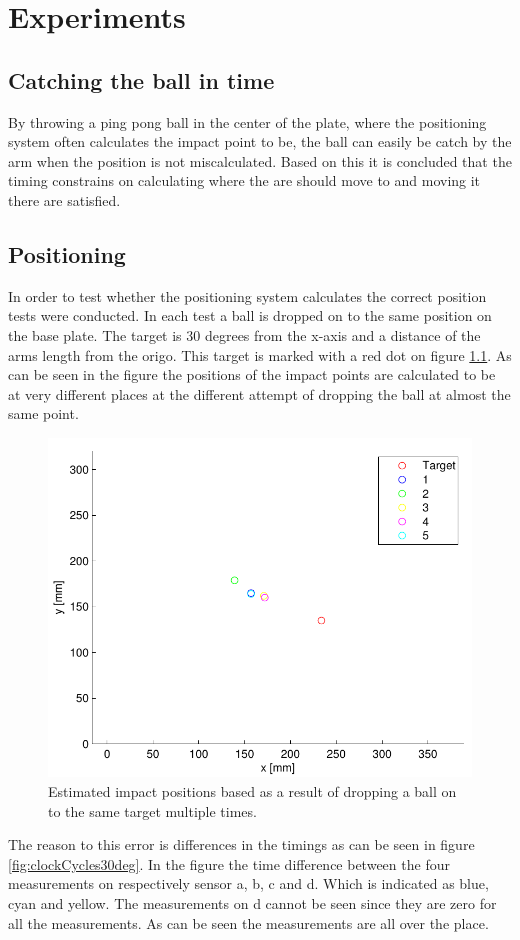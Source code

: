 \chapter{Experiments} %
\label{chap:experiments}


\section{Catching the ball in time}
By throwing a ping pong ball in the center of the plate, where the positioning system often calculates the impact point to be, the ball can easily be catch by the arm when the position is not miscalculated. Based on this it is concluded that the timing constrains on calculating where the are should move to and moving it there are satisfied.
\section{Positioning}
In order to test whether the positioning system calculates the correct position tests were conducted.
In each test a ball is dropped on to the same position on the base plate. The target is 30 degrees from the x-axis and a distance of the arms length from the origo. This target is marked with a red dot on figure \ref{fig:testRes30deg}. 
As can be seen in the figure the positions of the impact points are calculated to be at very different places at the different attempt of dropping the ball at almost the same point.
\begin{figure}[htb]
	\centering
	\includegraphics[width=.8\textwidth]{figures/testRes30deg.pdf}
	\caption{Estimated impact positions based as a result of dropping a ball on to the same target multiple times.}
	\label{fig:testRes30deg}
\end{figure}
The reason to this error is differences in the timings as can be seen in figure \ref{fig:clockCycles30deg}. In the figure the time difference between the four measurements on respectively sensor a, b, c and d. Which is indicated as blue, cyan and yellow. The measurements on d cannot be seen since they are zero for all the measurements. As can be seen the measurements are all over the place.

